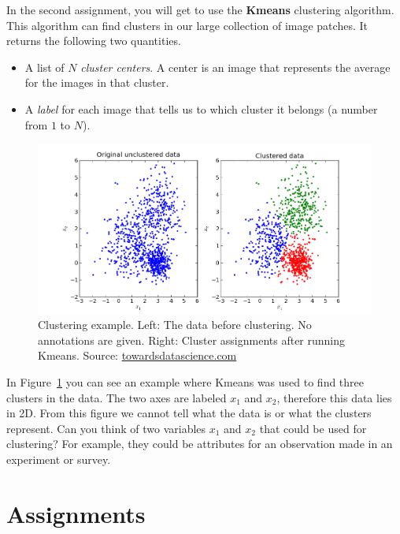 \documentclass[a4paper]{article}
\begin{document}
		In the second assignment, you will get to use the \textbf{Kmeans} clustering algorithm. 
		This algorithm can find clusters in our large collection of image patches.
		It returns the following two quantities.
		\begin{itemize}
			\item A list of $N$ \emph{cluster centers}. 
			A center is an image that represents the average for the images in that cluster.
			\item A \emph{label} for each image that tells us to which cluster it belongs (a number from $1$ to $N$).
		\end{itemize}
		\begin{figure}[tb]
			\centering
			\includegraphics[width=0.8\linewidth]{clustering-example}
			\caption{
				Clustering example. 
				Left: The data before clustering. No annotations are given.
				Right: Cluster assignments after running Kmeans.
				Source: \href{https://towardsdatascience.com/k-means-data-clustering-bce3335d2203}{towardsdatascience.com}
			}
			\label{fig:clustering-example}
		\end{figure}
		In Figure~\ref{fig:clustering-example} you can see an example where Kmeans was used to find three clusters in the data.
		The two axes are labeled $x_1$ and $x_2$, therefore this data lies in 2D.
		From this figure we cannot tell what the data is or what the clusters represent. 
		Can you think of two variables $x_1$ and $x_2$ that could be used for clustering?
		For example, they could be attributes for an observation made in an experiment or survey.

\section{Assignments}
\end{document}
